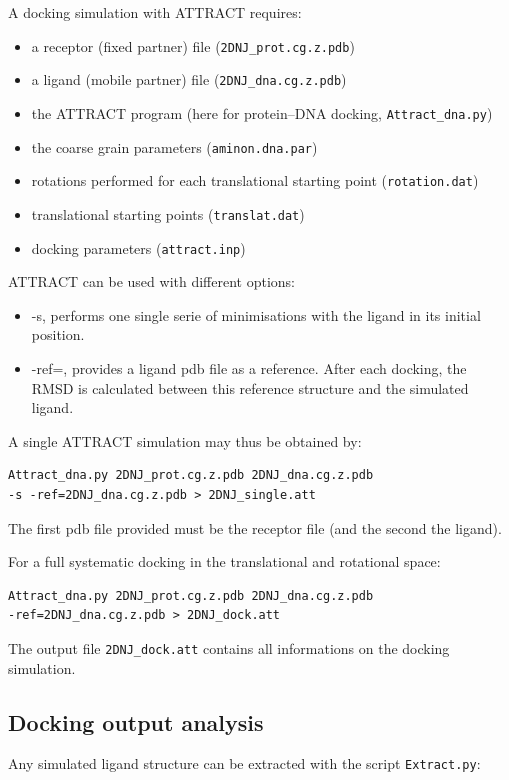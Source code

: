 \documentclass[12pt,a4paper]{article}
\begin{document}
A docking simulation with ATTRACT requires:
\begin{itemize}
\item a receptor (fixed partner) file ({\tt 2DNJ\_prot.cg.z.pdb})
\item a ligand (mobile partner) file ({\tt 2DNJ\_dna.cg.z.pdb})
\item the ATTRACT program (here for protein--DNA docking, {\tt  Attract\_dna.py})
\item the coarse grain parameters ({\tt aminon.dna.par})
\item rotations performed for each translational starting point ({\tt rotation.dat})
\item translational starting points ({\tt translat.dat})
\item docking parameters ({\tt attract.inp})
\end{itemize}

ATTRACT can be used with different options:
\begin{itemize}
\item -s, performs one single serie of minimisations with the ligand in its initial position.
\item -ref=, provides a ligand pdb file as a reference. After each docking, the RMSD is calculated between this reference structure and the simulated ligand.
\end{itemize}

A single ATTRACT simulation may thus be obtained by:
\begin{verbatim}
Attract_dna.py 2DNJ_prot.cg.z.pdb 2DNJ_dna.cg.z.pdb 
-s -ref=2DNJ_dna.cg.z.pdb > 2DNJ_single.att
\end{verbatim}

The first pdb file provided must be the receptor file (and the second the ligand).

For a full systematic docking in the translational and rotational space:
\begin{verbatim}
Attract_dna.py 2DNJ_prot.cg.z.pdb 2DNJ_dna.cg.z.pdb 
-ref=2DNJ_dna.cg.z.pdb > 2DNJ_dock.att
\end{verbatim}

The output file {\tt 2DNJ\_dock.att} contains all informations on the docking simulation.

\subsection{Docking output analysis}

Any simulated ligand structure can be extracted with the script {\tt Extract.py}:
\end{document}
